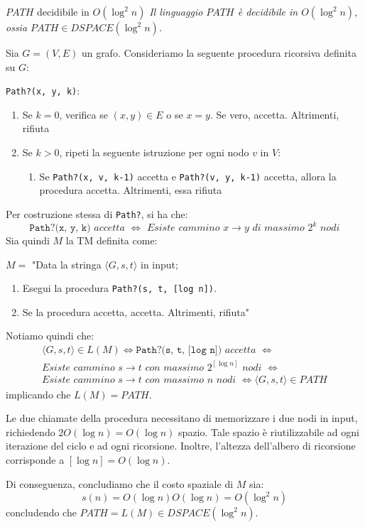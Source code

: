 \begin{Thm}{$PATH$ decidibile in $O(\log^2 n)$}{}\label{thm:path-decidible-log2n}
\textit{Il linguaggio $PATH$ è decidibile in $O(\log^2 n)$, ossia $PATH\in DSPACE(\log^2 n)$.}
\begin{demonstration}
Sia $G = (V, E)$ un grafo. Consideriamo la seguente procedura ricorsiva definita su $G$:

\texttt{Path?(x, y, k)}:
\begin{enumerate}
    \item Se $k = 0$, verifica se $(x, y)\in E$ o se $x = y$. Se vero, accetta. Altrimenti, rifiuta
    \item Se $k > 0$, ripeti la seguente istruzione per ogni nodo $v$ in $V$:
    \begin{enumerate}
        \item Se \texttt{Path?(x, v, k-1)} accetta e \texttt{Path?(v, y, k-1)} accetta, allora la procedura accetta. Altrimenti, essa rifiuta
    \end{enumerate}
\end{enumerate}
Per costruzione stessa di \texttt{Path?}, si ha che:
\begin{equation*}
    \texttt{Path?(x, y, k)}\textit{ accetta }\iff\textit{ Esiste cammino }x\to y\textit{ di massimo }2^k\textit{ nodi}
\end{equation*}
Sia quindi $M$ la TM definita come:

$M =$ "Data la stringa $\langle G, s, t\rangle$ in input;
\begin{enumerate}
    \item Esegui la procedura \texttt{Path?(s, t, [log n])}.
    \item Se la procedura accetta, accetta. Altrimenti, rifiuta"
\end{enumerate}
Notiamo quindi che:
\begin{align*}
\langle G, s, t\rangle\in L(M)\iff\texttt{Path?(s, t, [log n])}\textit{ accetta }\iff\\
\textit{Esiste cammino }s\to t\textit{ con massimo }2^{[\log n]}\textit{ nodi }\iff\\
\textit{Esiste cammino }s\to t\textit{ con massimo }n\textit{ nodi }\iff \langle G, s, t\rangle\in PATH
\end{align*}
implicando che $L(M) = PATH$.

Le due chiamate della procedura necessitano di memorizzare i due nodi in input, richiedendo $2O(\log n) = O(\log n)$ spazio. Tale spazio è riutilizzabile ad ogni iterazione del ciclo e ad ogni ricorsione. Inoltre, l’altezza dell’albero di ricorsione
corrisponde a $[\log n] = O(\log n)$. 

Di conseguenza, concludiamo che il costo spaziale di $M$ sia:
\begin{equation*}
    s(n) = O(\log n) O(\log n) = O(\log^2 n)    
\end{equation*}
concludendo che $PATH = L(M)\in DSPACE(\log^2 n)$.
\end{demonstration}
\end{Thm} 

